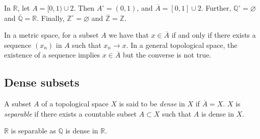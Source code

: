\begin{example}
	In \( \mathbb R \), let \( A = [0,1) \cup \qty{2} \).
	Then \( A^\circ = (0,1) \), and \( \overline A = [0,1] \cup \qty{2} \).
	Further, \( \mathbb Q^\circ = \varnothing \) and \( \overline {\mathbb Q} = \mathbb R \).
	Finally, \( \mathbb Z^\circ = \varnothing \) and \( \overline {\mathbb Z} = \mathbb Z \).
\end{example}
\begin{remark}
	In a metric space, for a subset \( A \) we have that \( x \in \overline A \) if and only if there exists a sequence \( (x_n) \) in \( A \) such that \( x_n \to x \).
	In a general topological space, the existence of a sequence implies \( x \in \overline A \) but the converse is not true.
\end{remark}

\subsection{Dense subsets}
\begin{definition}
	A subset \( A \) of a topological space \( X \) is said to be \textit{dense} in \( X \) if \( \overline A = X \).
	\( X \) is \textit{separable} if there exists a countable subset \( A \subset X \) such that \( A \) is dense in \( X \).
\end{definition}
\begin{example}
	\( \mathbb R \) is separable as \( \mathbb Q \) is dense in \( \mathbb R \).
\end{example}
